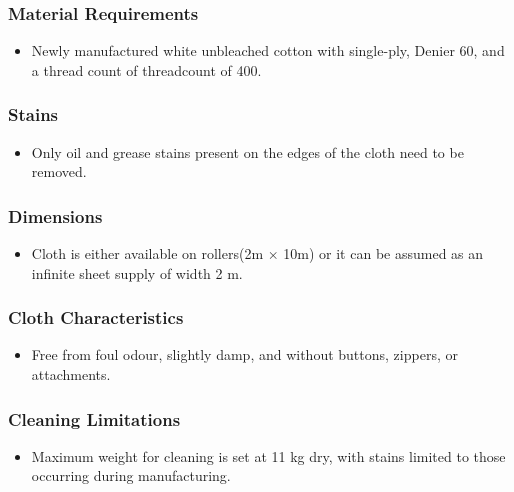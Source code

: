 \documentclass[table,french,english]{rapportCS}
\begin{document}
\subsubsection{Material Requirements}\label{sec:matspec}

    \begin{itemize}[label=$\bullet$]
        \item Newly manufactured white unbleached cotton with single-ply,  \gls{Denier} 60, and a thread count of \gls{threadcount} of 400.
      
    \end{itemize}
\subsubsection{Stains}\label{sec:matspec}
    \begin{itemize}[label=$\bullet$]
      \item Only oil and grease stains present on the edges of the cloth need to be removed.

    \end{itemize}
  
  \subsubsection{Dimensions}\label{sec:dimensions}
    \begin{itemize}[label=$\bullet$]
      \item Cloth is either available on rollers(2m $\times$ 10m) or it can be assumed as an infinite sheet supply of width 2 m.

    \end{itemize}
  
  \subsubsection{Cloth Characteristics}\label{sec:clothchar}
    \begin{itemize}[label=$\bullet$]
      \item Free from foul odour, slightly damp, and without buttons, zippers, or attachments.
    \end{itemize}
  
  \subsubsection{Cleaning Limitations}\label{sec:cleanlim}
    \begin{itemize}[label=$\bullet$]
      \item Maximum weight for cleaning is set at 11 kg dry, with stains limited to those occurring during manufacturing.
    \end{itemize}
\end{document}
